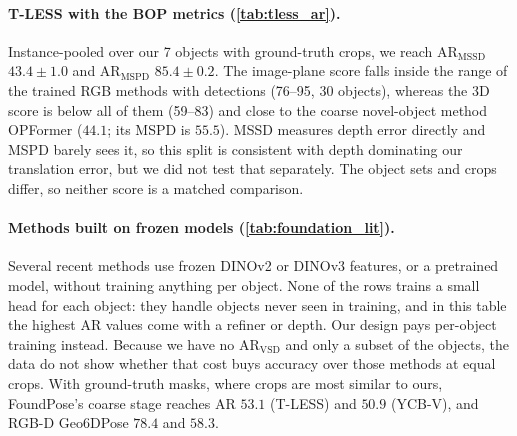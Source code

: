 \paragraph{T-LESS with the BOP metrics (\cref{tab:tless_ar}).} Instance-pooled over our 7 objects with ground-truth crops, we reach AR$_\text{MSSD}$ $43.4\pm1.0$ and AR$_\text{MSPD}$ $85.4\pm0.2$. The image-plane score falls inside the range of the trained RGB methods with detections (76--95, 30 objects), whereas the 3D score is below all of them (59--83) and close to the coarse novel-object method OPFormer ($44.1$; its MSPD is $55.5$). MSSD measures depth error directly and MSPD barely sees it, so this split is consistent with depth dominating our translation error, but we did not test that separately. The object sets and crops differ, so neither score is a matched comparison.

\paragraph{Methods built on frozen models (\cref{tab:foundation_lit}).} Several recent methods use frozen DINOv2 or DINOv3 features, or a pretrained model, without training anything per object. None of the rows trains a small head for each object: they handle objects never seen in training, and in this table the highest AR values come with a refiner or depth. Our design pays per-object training instead. Because we have no AR$_\text{VSD}$ and only a subset of the objects, the data do not show whether that cost buys accuracy over those methods at equal crops. With ground-truth masks, where crops are most similar to ours, FoundPose's coarse stage reaches AR $53.1$ (T-LESS) and $50.9$ (YCB-V), and RGB-D Geo6DPose $78.4$ and $58.3$.

\begin{table}[t]
  \centering\footnotesize
  \setlength{\tabcolsep}{3pt}
  \resizebox{\linewidth}{!}{}
  \caption{\textbf{Translation on general objects}, real test sets, ground-truth boxes. Translation recall (\%) within 2/5/10\,cm and mean error (cm; SYMSOL-T in scene units). Box only: the translation implied by the ground-truth box and the training-mean depth scale; ours: the DINOv3 translation block on the frozen selected tree (\cref{sec:sixdof_method}), from the original view or averaged over the 4 orbit views. 3 seeds. LiePose: average over the same 7 T-LESS objects (Tab.~8 of~\cite{hsiao2024liepose}). SYMSOL-T is in scene units, so only the mean distance is reported; the published SYMSOL-T means are our averages of the per-shape values in Tab.~3 of~\cite{hsiao2024liepose}.}
  \label{tab:trans_xobj}
\end{table}

